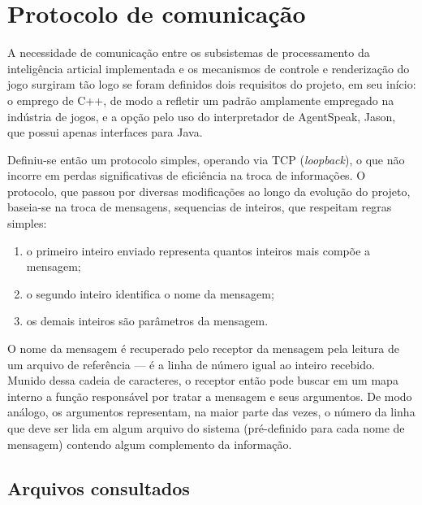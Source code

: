 \section{Protocolo de comunicação}\label{sec:protocolo}

A necessidade de comunicação entre os subsistemas de processamento da inteligência articial implementada e os mecanismos de controle e renderização do jogo surgiram tão logo se foram definidos dois requisitos do projeto, em seu início: o emprego de C++, de modo a refletir um padrão amplamente empregado na indústria de jogos, e a opção pelo uso do interpretador de AgentSpeak, Jason, que possui apenas interfaces para Java.

Definiu-se então um protocolo simples, operando via TCP (\emph{loopback}), o que não incorre em perdas significativas de eficiência na troca de informações. O protocolo, que passou por diversas modificações ao longo da evolução do projeto, baseia-se na troca de mensagens, sequencias de inteiros, que respeitam regras simples:
\begin{enumerate}
\item o primeiro inteiro enviado representa quantos inteiros mais compõe a mensagem;
\item o segundo inteiro identifica o nome da mensagem;
\item os demais inteiros são parâmetros da mensagem.
\end{enumerate}

O nome da mensagem é recuperado pelo receptor da mensagem pela leitura de um arquivo de referência --- é a linha de número igual ao inteiro recebido. Munido dessa cadeia de caracteres, o receptor então pode buscar em um mapa interno a função responsável por tratar a mensagem e seus argumentos. De modo análogo, os argumentos representam, na maior parte das vezes, o número da linha que deve ser lida em algum arquivo do sistema (pré-definido para cada nome de mensagem) contendo algum complemento da informação.

\subsection{Arquivos consultados}


